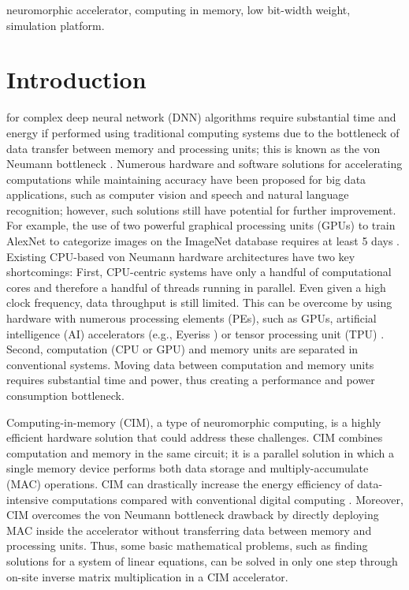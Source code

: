 \documentclass[journal]{IEEEtran}
\begin{document}
\begin{IEEEkeywords}
neuromorphic accelerator, computing in memory, low bit-width weight, simulation platform.
\end{IEEEkeywords}

\IEEEpeerreviewmaketitle
\section{Introduction}

 for complex deep neural network (DNN) algorithms require substantial time and energy if performed using traditional computing systems due to the bottleneck of data transfer between memory and processing units; this is known as the von Neumann bottleneck \cite{von_Neumann_bottleneck_1, von_Neumann_bottleneck_2}. Numerous hardware \cite{hardware_Kala, hardware_Ghanbari} and software solutions for accelerating computations while maintaining accuracy have been proposed for big data applications, such as computer vision and speech and natural language recognition; however, such solutions still have potential for further improvement. For example, the use of two powerful graphical processing units (GPUs) to train AlexNet to categorize images on the ImageNet database requires at least 5 days \cite{ImageNet_GPU}. Existing CPU-based von Neumann hardware architectures have two key shortcomings: First, CPU-centric systems have only a handful of computational cores and therefore a handful of threads running in parallel. Even given a high clock frequency, data throughput is still limited. This can be overcome by using hardware with numerous processing elements (PEs), such as GPUs, artificial intelligence (AI) accelerators (e.g., Eyeriss \cite{Eyeriss}) or tensor processing unit (TPU) \cite{TPU}. Second, computation (CPU or GPU) and memory units are separated in conventional systems. Moving data between computation and memory units requires substantial time and power, thus creating a performance and power consumption bottleneck.


Computing-in-memory (CIM), a type of neuromorphic computing, is a
highly efficient hardware solution that could address these challenges. CIM
combines computation and memory in the same circuit; it is a parallel solution
in which a single memory device performs both data storage and multiply-accumulate (MAC) operations. CIM can drastically increase the energy efficiency of data-intensive computations compared with conventional digital
computing \cite{NE, NN, IEEE}. Moreover, CIM overcomes the von Neumann bottleneck
drawback by directly deploying MAC inside the accelerator without
transferring data between memory and processing units. Thus, some basic
mathematical problems, such as finding solutions for a system of linear
equations, can be solved in only one step \cite{PNAS} through on-site inverse matrix
multiplication in a CIM accelerator.
\end{document}
